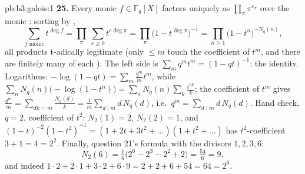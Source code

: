 \begin{solution}{pb:b3:galois:1}
\textbf{25.} Every monic $f \in \mathbb F_q[X]$ factors
uniquely as $\prod_\pi\pi^{e_\pi}$ over the monic
: sorting by ,
\[
\sum_{f \text{ monic}}t^{\deg f}
= \prod_\pi\ \sum_{e \geq 0}t^{e\deg\pi}
= \prod_\pi\bigl(1 - t^{\deg\pi}\bigr)^{-1}
= \prod_{n \geq 1}\bigl(1 - t^n\bigr)^{-N_q(n)},
\]
all products t-adically legitimate (only  $\leq m$
touch the coefficient of $t^m$, and there are finitely many
 of each ). The left side is $\sum_m
q^mt^m = (1 - qt)^{-1}$: the identity. Logarithms: $-\log(1 -
qt) = \sum_m\frac{q^m}mt^m$, while $\sum_nN_q(n)\bigl(-\log(1
- t^n)\bigr) = \sum_nN_q(n)\sum_k\frac{t^{nk}}k$; the
coefficient of $t^m$ gives $\frac{q^m}m = \sum_{dk = m}
\frac{N_q(d)}k = \frac1m\sum_{d \mid m}d\,N_q(d)$, i.e.\
$q^m = \sum_{d\mid m}d\,N_q(d)$. Hand check, $q = 2$,
coefficient of $t^2$: $N_2(1) = 2$, $N_2(2) = 1$, and
$(1 - t)^{-2}(1 - t^2)^{-1} = (1 + 2t + 3t^2 + \dots)(1 + t^2
+ \dots)$ has $t^2$-coefficient $3 + 1 = 4 = 2^2$. Finally,
question 21's formula with the divisors $1, 2, 3, 6$:
\[
N_2(6) = \tfrac16\bigl(2^6 - 2^3 - 2^2 + 2\bigr)
= \tfrac{54}6 = 9,
\]
and indeed $1\cdot2 + 2\cdot1 + 3\cdot2 + 6\cdot9 = 2 + 2 +
6 + 54 = 64 = 2^6$.
\end{solution}
